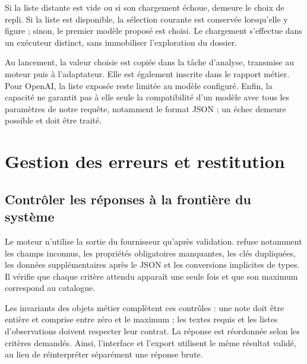 Si la liste distante est vide ou si son chargement échoue,  demeure le choix de repli. Si la liste est disponible, la sélection courante est conservée lorsqu'elle y figure ; sinon, le premier modèle proposé est choisi. Le chargement s'effectue dans un exécuteur distinct, sans immobiliser l'exploration du dossier.

Au lancement, la valeur choisie est copiée dans la tâche d'analyse, transmise au moteur puis à l'adaptateur. Elle est également inscrite dans le rapport métier. Pour OpenAI, la liste exposée reste limitée au modèle configuré. Enfin, la capacité  ne garantit pas à elle seule la compatibilité d'un modèle avec tous les paramètres de notre requête, notamment le format JSON ; un échec demeure possible et doit être traité.

\clearpage
\section{Gestion des erreurs et restitution}
\label{sec:erreurs}
\subsection{Contrôler les réponses à la frontière du système}
Le moteur n'utilise la sortie du fournisseur qu'après validation.  refuse notamment les champs inconnus, les propriétés obligatoires manquantes, les clés dupliquées, les données supplémentaires après le JSON et les conversions implicites de types. Il vérifie que chaque critère attendu apparaît une seule fois et que son maximum correspond au catalogue.

Les invariants des objets métier complètent ces contrôles : une note doit être entière et comprise entre zéro et le maximum ; les textes requis et les listes d'observations doivent respecter leur contrat. La réponse est réordonnée selon les critères demandés. Ainsi, l'interface et l'export utilisent le même résultat validé, au lieu de réinterpréter séparément une réponse brute.

